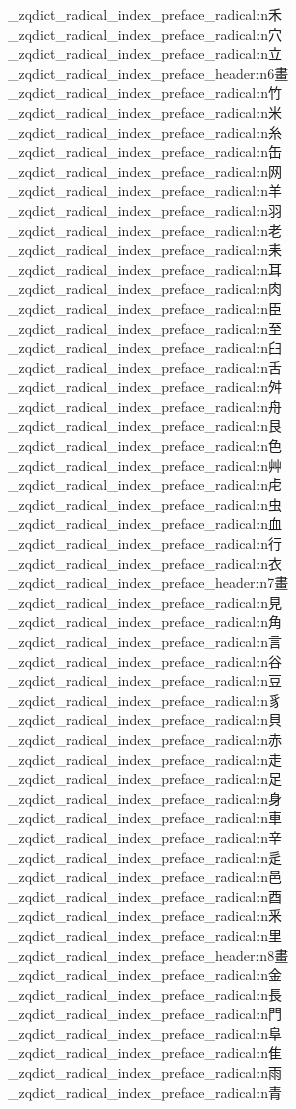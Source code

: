 {\begin{multicols}{5}
  \_zqdict_radical_index_preface_radical:n{禾}
  \_zqdict_radical_index_preface_radical:n{穴}
  \_zqdict_radical_index_preface_radical:n{立}
  \_zqdict_radical_index_preface_header:n{6畫}
  \_zqdict_radical_index_preface_radical:n{竹}
  \_zqdict_radical_index_preface_radical:n{米}
  \_zqdict_radical_index_preface_radical:n{糸}
  \_zqdict_radical_index_preface_radical:n{缶}
  \_zqdict_radical_index_preface_radical:n{网}
  \_zqdict_radical_index_preface_radical:n{羊}
  \_zqdict_radical_index_preface_radical:n{羽}
  \_zqdict_radical_index_preface_radical:n{老}
  \_zqdict_radical_index_preface_radical:n{耒}
  \_zqdict_radical_index_preface_radical:n{耳}
  \_zqdict_radical_index_preface_radical:n{肉}
  \_zqdict_radical_index_preface_radical:n{臣}
  \_zqdict_radical_index_preface_radical:n{至}
  \_zqdict_radical_index_preface_radical:n{臼}
  \_zqdict_radical_index_preface_radical:n{舌}
  \_zqdict_radical_index_preface_radical:n{舛}
  \_zqdict_radical_index_preface_radical:n{舟}
  \_zqdict_radical_index_preface_radical:n{艮}
  \_zqdict_radical_index_preface_radical:n{色}
  \_zqdict_radical_index_preface_radical:n{艸}
  \_zqdict_radical_index_preface_radical:n{虍}
  \_zqdict_radical_index_preface_radical:n{虫}
  \_zqdict_radical_index_preface_radical:n{血}
  \_zqdict_radical_index_preface_radical:n{行}
  \_zqdict_radical_index_preface_radical:n{衣}
  \_zqdict_radical_index_preface_header:n{7畫}
  \_zqdict_radical_index_preface_radical:n{見}
  \_zqdict_radical_index_preface_radical:n{角}
  \_zqdict_radical_index_preface_radical:n{言}
  \_zqdict_radical_index_preface_radical:n{谷}
  \_zqdict_radical_index_preface_radical:n{豆}
  \_zqdict_radical_index_preface_radical:n{豸}
  \_zqdict_radical_index_preface_radical:n{貝}
  \_zqdict_radical_index_preface_radical:n{赤}
  \_zqdict_radical_index_preface_radical:n{走}
  \_zqdict_radical_index_preface_radical:n{足}
  \_zqdict_radical_index_preface_radical:n{身}
  \_zqdict_radical_index_preface_radical:n{車}
  \_zqdict_radical_index_preface_radical:n{辛}
  \_zqdict_radical_index_preface_radical:n{辵}
  \_zqdict_radical_index_preface_radical:n{邑}
  \_zqdict_radical_index_preface_radical:n{酉}
  \_zqdict_radical_index_preface_radical:n{釆}
  \_zqdict_radical_index_preface_radical:n{里}
  \_zqdict_radical_index_preface_header:n{8畫}
  \_zqdict_radical_index_preface_radical:n{金}
  \_zqdict_radical_index_preface_radical:n{長}
  \_zqdict_radical_index_preface_radical:n{門}
  \_zqdict_radical_index_preface_radical:n{阜}
  \_zqdict_radical_index_preface_radical:n{隹}
  \_zqdict_radical_index_preface_radical:n{雨}
  \_zqdict_radical_index_preface_radical:n{青}

\end{multicols}}
